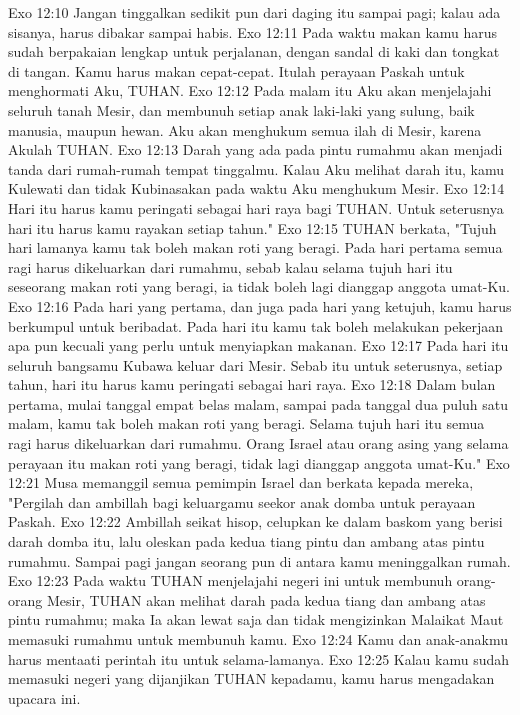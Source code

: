 Exo 12:10  Jangan tinggalkan sedikit pun dari daging itu sampai pagi; kalau ada sisanya, harus dibakar sampai habis.
Exo 12:11  Pada waktu makan kamu harus sudah berpakaian lengkap untuk perjalanan, dengan sandal di kaki dan tongkat di tangan. Kamu harus makan cepat-cepat. Itulah perayaan Paskah untuk menghormati Aku, TUHAN.
Exo 12:12  Pada malam itu Aku akan menjelajahi seluruh tanah Mesir, dan membunuh setiap anak laki-laki yang sulung, baik manusia, maupun hewan. Aku akan menghukum semua ilah di Mesir, karena Akulah TUHAN.
Exo 12:13  Darah yang ada pada pintu rumahmu akan menjadi tanda dari rumah-rumah tempat tinggalmu. Kalau Aku melihat darah itu, kamu Kulewati dan tidak Kubinasakan pada waktu Aku menghukum Mesir.
Exo 12:14  Hari itu harus kamu peringati sebagai hari raya bagi TUHAN. Untuk seterusnya hari itu harus kamu rayakan setiap tahun."
Exo 12:15  TUHAN berkata, "Tujuh hari lamanya kamu tak boleh makan roti yang beragi. Pada hari pertama semua ragi harus dikeluarkan dari rumahmu, sebab kalau selama tujuh hari itu seseorang makan roti yang beragi, ia tidak boleh lagi dianggap anggota umat-Ku.
Exo 12:16  Pada hari yang pertama, dan juga pada hari yang ketujuh, kamu harus berkumpul untuk beribadat. Pada hari itu kamu tak boleh melakukan pekerjaan apa pun kecuali yang perlu untuk menyiapkan makanan.
Exo 12:17  Pada hari itu seluruh bangsamu Kubawa keluar dari Mesir. Sebab itu untuk seterusnya, setiap tahun, hari itu harus kamu peringati sebagai hari raya.
Exo 12:18  Dalam bulan pertama, mulai tanggal empat belas malam, sampai pada tanggal dua puluh satu malam, kamu tak boleh makan roti yang beragi. Selama tujuh hari itu semua ragi harus dikeluarkan dari rumahmu. Orang Israel atau orang asing yang selama perayaan itu makan roti yang beragi, tidak lagi dianggap anggota umat-Ku."
Exo 12:21  Musa memanggil semua pemimpin Israel dan berkata kepada mereka, "Pergilah dan ambillah bagi keluargamu seekor anak domba untuk perayaan Paskah.
Exo 12:22  Ambillah seikat hisop, celupkan ke dalam baskom yang berisi darah domba itu, lalu oleskan pada kedua tiang pintu dan ambang atas pintu rumahmu. Sampai pagi jangan seorang pun di antara kamu meninggalkan rumah.
Exo 12:23  Pada waktu TUHAN menjelajahi negeri ini untuk membunuh orang-orang Mesir, TUHAN akan melihat darah pada kedua tiang dan ambang atas pintu rumahmu; maka Ia akan lewat saja dan tidak mengizinkan Malaikat Maut memasuki rumahmu untuk membunuh kamu.
Exo 12:24  Kamu dan anak-anakmu harus mentaati perintah itu untuk selama-lamanya.
Exo 12:25  Kalau kamu sudah memasuki negeri yang dijanjikan TUHAN kepadamu, kamu harus mengadakan upacara ini.
